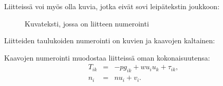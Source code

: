 \documentclass[finnish, 12pt, a4paper, sci, utf8, pdfa]{aaltothesis}
\begin{document}
Liitteissä voi myös olla kuvia, jotka
eivät sovi leipätekstin joukkoon:
\begin{figure}[htb]
\begin{center}
\end{center}
\caption{Kuvateksti, jossa on liitteen numerointi}
\label{liitekuva}
\end{figure}
Liitteiden taulukoiden numerointi on kuvien ja kaavojen kaltainen:
\begin{table}[htb]
\caption{Taulukon kuvateksti.}
\label{liitetaulukko}
\begin{center}
\end{center}
\end{table}
Kaavojen numerointi muodostaa liitteissä oman kokonaisuutensa:
\begin{eqnarray}
T_{ik} &=& -p g_{ik} + w u_i u_k + \tau_{ik},  \label{liitekaava3} \\
n_i    &=& n u_i + v_i.                      \label{liitekaava4}
\end{eqnarray}
\end{document}
